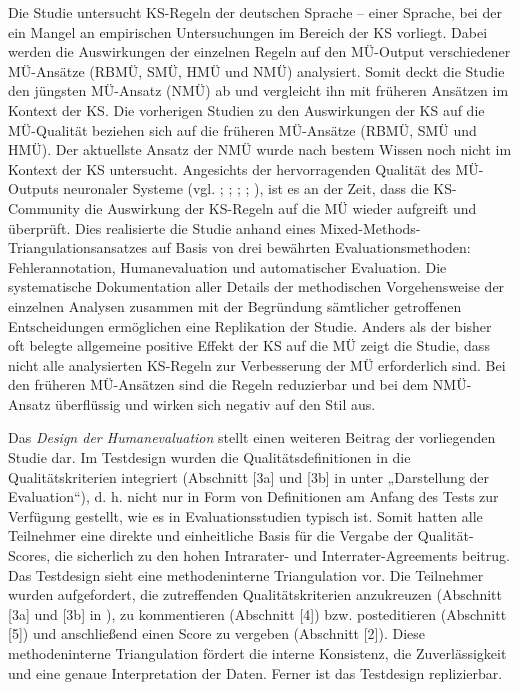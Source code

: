 Die Studie untersucht KS-Regeln der deutschen Sprache -- einer Sprache, bei der ein Mangel an empirischen Untersuchungen im Bereich der KS vorliegt. Dabei werden die Auswirkungen der einzelnen Regeln auf den MÜ-Output verschiedener MÜ-Ansätze (RBMÜ, SMÜ, HMÜ und NMÜ) analysiert. Somit deckt die Studie den jüngsten MÜ-Ansatz (NMÜ) ab und vergleicht ihn mit früheren Ansätzen im Kontext der KS. Die vorherigen Studien zu den Auswirkungen der KS auf die MÜ-Qualität beziehen sich auf die früheren MÜ-Ansätze (RBMÜ, SMÜ und HMÜ). Der aktuellste Ansatz der NMÜ wurde nach bestem Wissen noch nicht im Kontext der KS untersucht. Angesichts der hervorragenden Qualität des MÜ-Outputs neuronaler Systeme (vgl. \citealt{BentivogliEtAl2016}; \citealt{WuEtAl2016}; \citealt{CastilhoEtAl2017b}; \citealt{ToralSanchez-Cartagena2017}; \citealt{Popović2018}), ist es an der Zeit, dass die KS-Community die Auswirkung der KS-Regeln auf die MÜ wieder aufgreift und überprüft. Dies realisierte die Studie anhand eines Mixed-Methods-Triangulationsansatzes auf Basis von drei bewährten Evaluationsmethoden: Fehlerannotation, Humanevaluation und automatischer Evaluation. Die systematische Dokumentation aller Details der methodischen Vorgehensweise der einzelnen Analysen zusammen mit der Begründung sämtlicher getroffenen Entscheidungen ermöglichen eine Replikation der Studie. Anders als der bisher oft belegte allgemeine positive Effekt der KS auf die MÜ zeigt die Studie, dass nicht alle analysierten KS-Regeln zur Verbesserung der MÜ erforderlich sind. Bei den früheren MÜ-Ansätzen sind die Regeln reduzierbar und bei dem NMÜ-Ansatz überflüssig und wirken sich negativ auf den Stil aus.

Das \textit{Design der Humanevaluation} stellt einen weiteren Beitrag der vorliegenden Studie dar. Im Testdesign wurden die Qualitätsdefinitionen in die Qualitätskriterien integriert (Abschnitt [3a] und [3b] in  unter  „Darstellung der Evaluation“), d. h. nicht nur in Form von Definitionen am Anfang des Tests zur Verfügung gestellt, wie es in Evaluationsstudien typisch ist. Somit hatten alle Teilnehmer eine direkte und einheitliche Basis für die Vergabe der Qualität-Scores, die sicherlich zu den hohen Intrarater- und Interrater-Agreements beitrug. Das Testdesign sieht eine methodeninterne Triangulation vor. Die Teilnehmer wurden aufgefordert, die zutreffenden Qualitätskriterien anzukreuzen (Abschnitt [3a] und [3b] in ), zu kommentieren (Abschnitt [4]) bzw. posteditieren (Abschnitt [5]) und anschließend einen Score zu vergeben (Abschnitt [2]). Diese methodeninterne Triangulation fördert die interne Konsistenz, die Zuverlässigkeit und eine genaue Interpretation der Daten. Ferner ist das Testdesign replizierbar.

